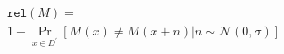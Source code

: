 \documentclass{uai2026}
\begin{document}

\begin{equation}
    \label{eq:rel}
    \begin{aligned}
    \mathtt{rel}(M) = \\
    1 - \Pr_{x\in D^\prime}[M(x) \neq M(x+n)|n\sim\mathcal{N}(0,\sigma)]
    \end{aligned}
\end{equation}




\end{document}
